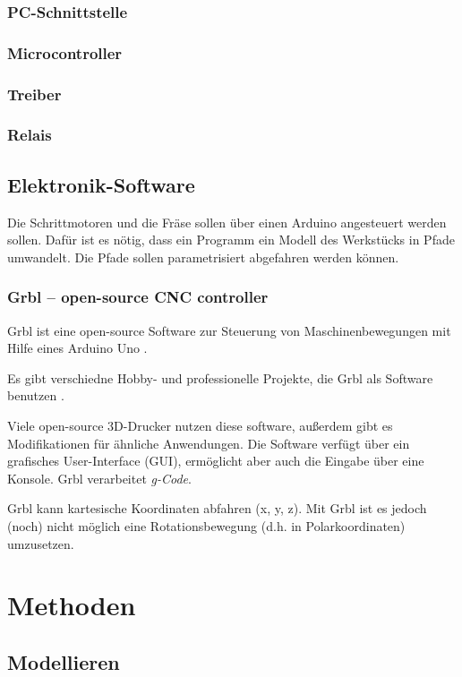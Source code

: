 \documentclass[
	a4paper,
	smallheadings,
	german,
	]
	{scrreprt}
\begin{document}
	\subsection{PC-Schnittstelle}
	\subsection{Microcontroller}
	\subsection{Treiber}
	\subsection{Relais}
\section{Elektronik-Software}
Die Schrittmotoren und die Fräse sollen über einen Arduino angesteuert werden sollen.
Dafür ist es nötig, dass ein Programm ein Modell des Werkstücks in Pfade umwandelt.
Die Pfade sollen parametrisiert abgefahren werden können.

\subsection{Grbl -- open-source CNC controller}
Grbl ist eine open-source Software zur Steuerung von Maschinenbewegungen mit Hilfe eines Arduino Uno \autocite{:Sonny2017}.

Es gibt verschiedne Hobby- und professionelle Projekte, die Grbl als Software benutzen \autocite{:Herbert,:kickstarter,:Meissner}.

Viele open-source 3D-Drucker nutzen diese software, außerdem gibt es Modifikationen für ähnliche Anwendungen.
Die Software verfügt über ein grafisches User-Interface (GUI), ermöglicht aber auch die Eingabe über eine Konsole.
Grbl verarbeitet \textit{g-Code}.

Grbl kann kartesische Koordinaten abfahren (x, y, z). 
Mit Grbl ist es jedoch (noch) nicht möglich eine Rotationsbewegung (d.h. in Polarkoordinaten) umzusetzen.

\chapter{Methoden}

\section{Modellieren}
\end{document}
